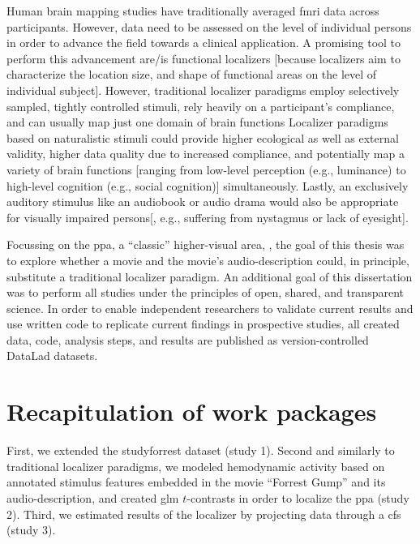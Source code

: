
Human brain mapping studies have traditionally averaged \ac{fmri} data across
participants.
%
However, data need to be assessed on the level of individual persons in order to
advance the field towards a clinical application.
A promising tool to perform this advancement are/is functional localizers
[because localizers aim to characterize the location size, and shape of
functional areas on the level of individual subject].
However, traditional localizer paradigms employ selectively sampled, tightly
controlled stimuli, rely heavily on a participant's compliance, and can usually
map just one domain of brain functions
Localizer paradigms based on naturalistic stimuli could provide higher
ecological as well as external validity, higher data quality due to increased
compliance, and potentially map a variety of brain functions [ranging from
low-level perception (e.g., luminance) to high-level cognition (e.g., social
cognition)] simultaneously.
Lastly, an exclusively auditory stimulus like an audiobook or audio drama would
also be appropriate for visually impaired persons[, e.g., suffering from
nystagmus or lack of eyesight].

Focussing on the \ac{ppa}, a ``classic'' higher-visual area,
\citep{epstein1998ppa}, the goal of this thesis was to explore whether a movie
and the movie's audio-description could, in principle, substitute a traditional
localizer paradigm.
An additional goal of this dissertation was to perform all studies under the
principles of open, shared, and transparent science.
%
In order to enable independent researchers to validate current results and use
written code to replicate current findings in prospective studies, all created
data, code, analysis steps, and results are published as version-controlled
DataLad \citep[\href{www.datalad.org}{datalad.org};][]{halchenko2021datalad}
datasets.


\section{Recapitulation of work packages}


%
First, we extended the studyforrest dataset (study 1).
%
Second and similarly to traditional localizer paradigms, we modeled hemodynamic
activity based on annotated stimulus features embedded in the movie ``Forrest
Gump'' and its audio-description, and created \ac{glm} $t$-contrasts in order to
localize the \ac{ppa} (study 2).
%
Third, we estimated results of the localizer by projecting data through a
\ac{cfs} (study 3).

